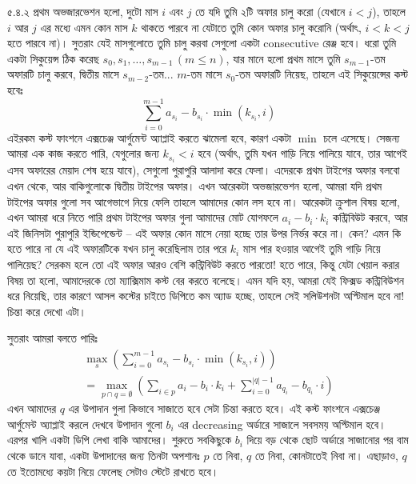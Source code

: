 \begin{Hint}{৫.৪.২}
প্রথম অভজারভেশন হলো, দুটো মাস $i$ এবং $j$ তে যদি তুমি ২টি অফার চালু করো (যেখানে $i < j$), তাহলে $i$ আর $j$ এর মধ্যে এমন কোন মাস $k$ থাকতে পারবে না যেটাতে তুমি কোন অফার চালু করোনি (অর্থাৎ, $i < k < j$ হতে পারবে না)। সুতরাং যেই মাসগুলোতে তুমি চালু করবা সেগুলো একটা consecutive রেঞ্জ হবে। ধরো তুমি একটা সিকুয়েন্স ঠিক করেছ $s_0, s_1, \ldots, s_{m-1} \, (m \le n)$, যার মানে হলো প্রথম মাসে তুমি $s_{m-1}$-তম অফারটি চালু করবে, দ্বিতীয় মাসে $s_{m-2}$-তম... $m$-তম মাসে $s_0$-তম অফারটি নিয়েছ, তাহলে এই সিকুয়েন্সের কস্ট হবেঃ
\[
  \sum_{i=0}^{m-1} a_{s_i} - b_{s_i} \cdot \min(k_{s_i}, i)
\]
এইরকম কস্ট ফাংশনে এক্সচেঞ্জ আর্গুমেন্ট অ্যাপ্লাই করতে ঝামেলা হবে, কারণ একটা $\min$ চলে এসেছে। সেজন্য আমরা এক কাজ করতে পারি, যেগুলোর জন্য $k_{s_i} < i$ হবে (অর্থাৎ, তুমি যখন গাড়ি নিয়ে পালিয়ে যাবে, তার আগেই এসব অফারের মেয়াদ শেষ হয়ে যাবে), সেগুলো পুরাপুরি আলাদা করে ফেলা। এদেরকে প্রথম টাইপের অফার বলবো এখন থেকে, আর বাকিগুলোকে দ্বিতীয় টাইপের অফার। এখন আরেকটা অভজারভেশন হলো, আমরা যদি প্রথম টাইপের অফার গুলো সব আগেভাগে নিয়ে ফেলি তাহলে আমাদের কোন লস হবে না। আরেকটা ক্রুশাল বিষয় হলো, এখন আমরা ধরে নিতে পারি প্রথম টাইপের অফার গুলা আমাদের মোট যোগফলে $a_i - b_i \cdot k_i$ কন্ট্রিবিউট করবে, আর এই জিনিসটা পুরাপুরি ইন্ডিপেন্ডেন্ট -- এই অফার কোন মাসে নেয়া হচ্ছে তার উপর নির্ভর করে না। কেন? এমন কি হতে পারে না যে এই অফারটিকে যখন চালু করেছিলাম তার পরে $k_i$ মাস পার হওয়ার আগেই তুমি গাড়ি নিয়ে পালিয়েছ? সেরকম হলে তো এই অফার আরও বেশি কন্ট্রিবিউট করতে পারতো! হতে পারে, কিন্তু যেটা খেয়াল করার বিষয় তা হলো, আমাদেরকে তো ম্যাক্সিমাম কস্ট বের করতে বলেছে। এমন যদি হয়, আমরা যেই ফিক্সড কন্ট্রিবিউশন ধরে নিয়েছি, তার কারণে আসল কস্টের চাইতে ডিপিতে কম অ্যাড হচ্ছে, তাহলে সেই সলিউশনটা অপ্টিমাল হবে না! চিন্তা করে দেখো এটা।

\noindent সুতরাং আমরা বলতে পারিঃ
\begin{gather*}
  \max_{s} \left ( \sum_{i=0}^{m-1} a_{s_i} - b_{s_i} \cdot \min(k_{s_i}, i) \right )\\
  = \max_{p \cap q = \emptyset} \left ( \sum_{i \in p} a_i - b_i \cdot k_i + \sum_{i=0}^{|q|-1} a_{q_i} - b_{q_i} \cdot i \right )
\end{gather*}
এখন আমাদের $q$ এর উপাদান গুলা কিভাবে সাজাতে হবে সেটা চিন্তা করতে হবে। এই কস্ট ফাংশনে এক্সচেঞ্জ আর্গুমেন্ট অ্যাপ্লাই করলে দেখবে উপাদান গুলো $b_i$ এর decreasing অর্ডারে সাজালে সবসময় অপ্টিমাল হবে। এরপর খালি একটা ডিপি লেখা বাকি আমাদের। শুরুতে সবকিছুকে $b_i$ দিয়ে বড় থেকে ছোট অর্ডারে সাজানোর পর বাম থেকে ডানে যাবা, একটা উপাদানের জন্য তিনটা অপশানঃ $p$ তে নিবা, $q$ তে নিবা, কোনটাতেই নিবা না। এছাড়াও, $q$ তে ইতোমধ্যে কয়টা নিয়ে ফেলেছ সেটাও স্টেটে রাখতে হবে।
\end{Hint}

